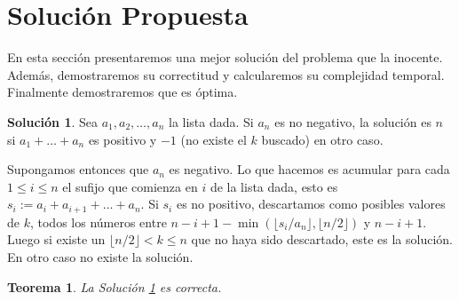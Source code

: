 \documentclass[10pt]{amsart}
\newtheorem{teo}[theorem]{Teorema}
\theoremstyle{definition}
\newtheorem{sol}[theorem]{Soluci\'on}
\numberwithin{equation}{section}
\begin{document}
	\section{Soluci\'on Propuesta}

		En esta secci\'on presentaremos una mejor soluci\'on del problema que la inocente. Adem\'as, demostraremos su correctitud y calcularemos su complejidad temporal. Finalmente demostraremos que es \'optima.
		
	\begin{sol}\label{sol_optima}
		Sea $a_1, a_2, \dots, a_n$ la lista dada. Si $a_n$ es no negativo, la soluci\'on es $n$ si $a_1 + \dots + a_n$ es positivo y $-1$ (no existe el $k$ buscado) en otro caso.
		
		Supongamos entonces que $a_n$ es negativo. Lo que hacemos es acumular para cada $1 \le i \le n$ el sufijo que comienza en $i$ de la lista dada, esto es $s_i := a_i + a_{i +1} + \dots + a_n$. Si $s_i$ es no positivo, descartamos como posibles valores de $k$, todos los n\'umeros entre $n - i + 1 - \min(\lfloor s_i/a_n \rfloor, \lfloor n/2 \rfloor)$ y $n - i + 1$. Luego si existe un $\lfloor n/2 \rfloor < k \le n$ que no haya sido descartado, este es la soluci\'on. En otro caso no existe la soluci\'on.
	\end{sol}

	
	\begin{teo}
		La Soluci\'on \ref{sol_optima} es correcta. 
	\end{teo}
\end{document}
